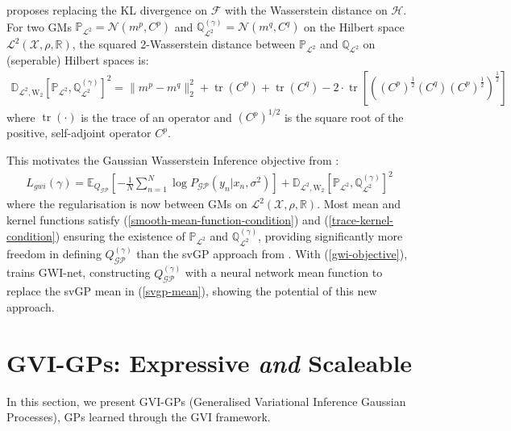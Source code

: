 \documentclass{article}
\newcommand{\tr}{\operatorname{tr}}
\newcommand{\GP}{\operatorname{\mathcal{GP}}}
\numberwithin{equation}{section}
\begin{document}
\cite{wild2022generalized} proposes replacing the KL divergence on $\mathcal{F}$ with the Wasserstein distance on $\mathcal{H}$. For two GMs $\mathbb{P}_{\mathcal{L}^2} = \mathcal{N}(m^p, C^p)$ and $\mathbb{Q}^{(\gamma)}_{\mathcal{L}^2} = \mathcal{N}(m^q, C^q)$ on the Hilbert space $\mathcal{L}^2(\mathcal{X}, \rho, \mathbb{R})$, the squared 2-Wasserstein distance between $\mathbb{P}_{\mathcal{L}^2}$ and $\mathbb{Q}_{\mathcal{L}^2}$ on (seperable) Hilbert spaces is:
\begin{align}
    \label{wasserstein-distance}
    \mathbb{D}_{\mathcal{L}^2, \text{W}_2} \left[\mathbb{P}_{\mathcal{L}^2}, \mathbb{Q}^{(\gamma)}_{\mathcal{L}^2}\right]^2 = \| m^p - m^q\|_2^2 + \tr(C^p) + \tr(C^q) - 2 \cdot \tr \left[ \left( \left(C^p\right)^{\frac{1}{2}} \left(C^q\right) \left(C^p\right)^{\frac{1}{2}}\right)^{\frac{1}{2}}\right]
\end{align}
where $\tr(\cdot)$ is the trace of an operator and $\left(C^p\right)^{1/2}$ is the square root of the positive, self-adjoint operator $C^p$. 

This motivates the Gaussian Wasserstein Inference objective from \cite{wild2022generalized}:
\begin{align}
    \label{gwi-objective}
    L_{gwi}(\gamma) = \mathbb{E}_{Q_{\GP}}\left[- \frac{1}{N}\sum_{n=1}^N \log P_{\GP}\left(y_n \vert x_n, \sigma^2\right) \right] + \mathbb{D}_{\mathcal{L}^2, \text{W}_2} \left[\mathbb{P}_{\mathcal{L}^2}, \mathbb{Q}^{(\gamma)}_{\mathcal{L}^2}\right]^2
\end{align}
where the regularisation is now between GMs on $\mathcal{L}^2(\mathcal{X}, \rho, \mathbb{R})$. Most mean and kernel functions satisfy (\ref{smooth-mean-function-condition}) and (\ref{trace-kernel-condition}) ensuring the existence of $\mathbb{P}_{\mathcal{L}^2}$ and $\mathbb{Q}^{(\gamma)}_{\mathcal{L}^2}$, providing significantly more freedom in defining $Q^{(\gamma)}_{\GP}$ than the svGP approach from \cite{titsias2009variational}. With (\ref{gwi-objective}), \cite{wild2022generalized} trains GWI-net, constructing $Q^{(\gamma)}_{\GP}$ with a neural network mean function to replace the svGP mean in (\ref{svgp-mean}), showing the potential of this new approach.


\newpage
\section{GVI-GPs: Expressive \textit{and} Scaleable}
In this section, we present GVI-GPs (Generalised Variational Inference Gaussian Processes), GPs learned through the GVI framework.
\end{document}
